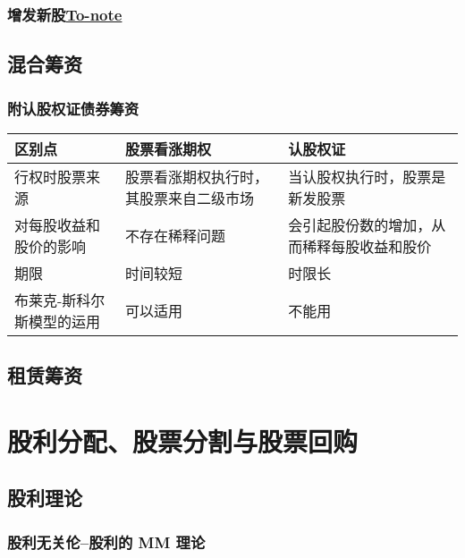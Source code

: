 \documentclass[11pt]{article}
\begin{document}
\subsubsection{增发新股\href{20210422164900-to\_note.org}{To-note}}
\label{sec:org69a7ad5}
\subsection{混合筹资}
\label{sec:orgb39642b}
\subsubsection{附认股权证债券筹资}
\label{sec:org0792318}
\begin{center}
\begin{tabular}{lll}
区别点 & 股票看涨期权 & 认股权证\\
\hline
行权时股票来源 & 股票看涨期权执行时，其股票来自二级市场 & 当认股权执行时，股票是新发股票\\
对每股收益和股价的影响 & 不存在稀释问题 & 会引起股份数的增加，从而稀释每股收益和股价\\
期限 & 时间较短 & 时限长\\
布莱克-斯科尔斯模型的运用 & 可以适用 & 不能用\\
\end{tabular}
\end{center}
\subsection{租赁筹资}
\label{sec:org1c8f066}

\section{股利分配、股票分割与股票回购}
\label{sec:orgab085f6}
\subsection{股利理论}
\label{sec:orge04e083}
\subsubsection{股利无关伦--股利的 MM 理论}
\label{sec:orgccdf8a1}
\end{document}
